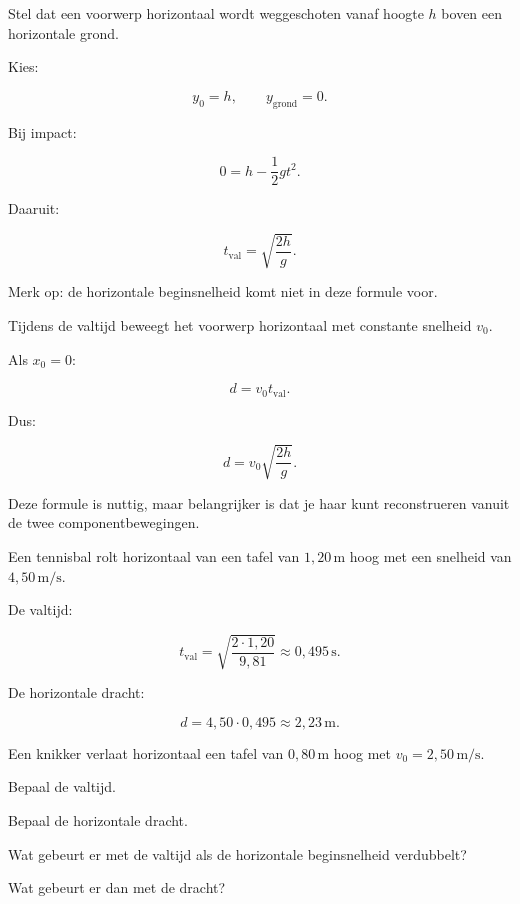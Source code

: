 \documentclass{ximera}
\begin{document}


Stel dat een voorwerp horizontaal wordt weggeschoten vanaf hoogte $h$
boven een horizontale grond.

Kies:

\[
y_0=h,
\qquad
y_{\mathrm{grond}}=0.
\]

Bij impact:

\[
0=h-\frac12gt^2.
\]

Daaruit:

\[
\boxed{
t_{\mathrm{val}}
=
\sqrt{\frac{2h}{g}}.
}
\]

Merk op: de horizontale beginsnelheid komt niet in deze formule voor.



Tijdens de valtijd beweegt het voorwerp horizontaal met constante
snelheid $v_0$.

Als $x_0=0$:

\[
d=v_0t_{\mathrm{val}}.
\]

Dus:

\[
\boxed{
d
=
v_0\sqrt{\frac{2h}{g}}.
}
\]

Deze formule is nuttig, maar belangrijker is dat je haar kunt
reconstrueren vanuit de twee componentbewegingen.


\begin{voorbeeld}

Een tennisbal rolt horizontaal van een tafel van
$1,20\,\mathrm{m}$ hoog met een snelheid van
$4,50\,\mathrm{m/s}$.

De valtijd:

\[
t_{\mathrm{val}}
=
\sqrt{\frac{2\cdot1,20}{9,81}}
\approx0,495\,\mathrm{s}.
\]

De horizontale dracht:

\[
d
=
4,50\cdot0,495
\approx2,23\,\mathrm{m}.
\]

\end{voorbeeld}


\begin{oefening}{\oefB\ESS}

Een knikker verlaat horizontaal een tafel van
$0,80\,\mathrm{m}$ hoog met $v_0=2,50\,\mathrm{m/s}$.

\begin{question}
Bepaal de valtijd.
\end{question}

\begin{question}
Bepaal de horizontale dracht.
\end{question}

\begin{question}
Wat gebeurt er met de valtijd als de horizontale beginsnelheid
verdubbelt?
\end{question}

\begin{question}
Wat gebeurt er dan met de dracht?
\end{question}

\end{oefening}
\end{document}
